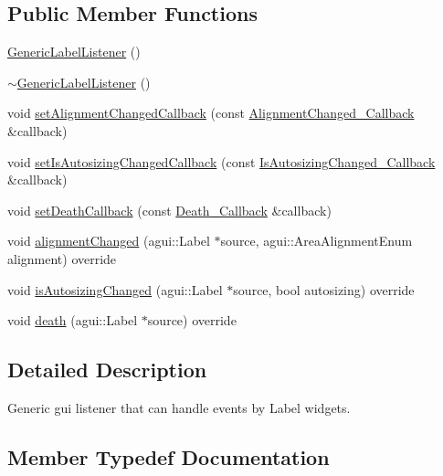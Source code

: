 \subsection*{Public Member Functions}
\begin{DoxyCompactItemize}
\item 
\mbox{\hyperlink{classec_1_1_generic_label_listener_a743def8b1800f2bc7d14c3ef05e4fa45}{Generic\+Label\+Listener}} ()
\item 
\mbox{\hyperlink{classec_1_1_generic_label_listener_aaf153b11abad595d7f523d091dec3903}{$\sim$\+Generic\+Label\+Listener}} ()
\item 
void \mbox{\hyperlink{classec_1_1_generic_label_listener_a02e2fc85023744de2891a53058bb229b}{set\+Alignment\+Changed\+Callback}} (const \mbox{\hyperlink{classec_1_1_generic_label_listener_af470c076b7748036de36bc1d99bce445}{Alignment\+Changed\+\_\+\+Callback}} \&callback)
\item 
void \mbox{\hyperlink{classec_1_1_generic_label_listener_a3141f73b5396a6a57b81159619ada6db}{set\+Is\+Autosizing\+Changed\+Callback}} (const \mbox{\hyperlink{classec_1_1_generic_label_listener_adf4cec1bd13682ce66c52f0484fe46c6}{Is\+Autosizing\+Changed\+\_\+\+Callback}} \&callback)
\item 
void \mbox{\hyperlink{classec_1_1_generic_label_listener_abf6b7abe8b5aab4c772d6e4b1cd0baaf}{set\+Death\+Callback}} (const \mbox{\hyperlink{classec_1_1_generic_label_listener_af79a68f4cb5c696fa1d921e7441d93eb}{Death\+\_\+\+Callback}} \&callback)
\item 
void \mbox{\hyperlink{classec_1_1_generic_label_listener_a9e62304bb430f496769ba096dc33e21c}{alignment\+Changed}} (agui\+::\+Label $\ast$source, agui\+::\+Area\+Alignment\+Enum alignment) override
\item 
void \mbox{\hyperlink{classec_1_1_generic_label_listener_aec79c600f300b002190155d67794e3c6}{is\+Autosizing\+Changed}} (agui\+::\+Label $\ast$source, bool autosizing) override
\item 
void \mbox{\hyperlink{classec_1_1_generic_label_listener_a941183da9f6cef4a2ab6ced1814a2d84}{death}} (agui\+::\+Label $\ast$source) override
\end{DoxyCompactItemize}


\subsection{Detailed Description}
Generic gui listener that can handle events by Label widgets. 

\subsection{Member Typedef Documentation}
\mbox{\label{classec_1_1_generic_label_listener_af470c076b7748036de36bc1d99bce445}} 
